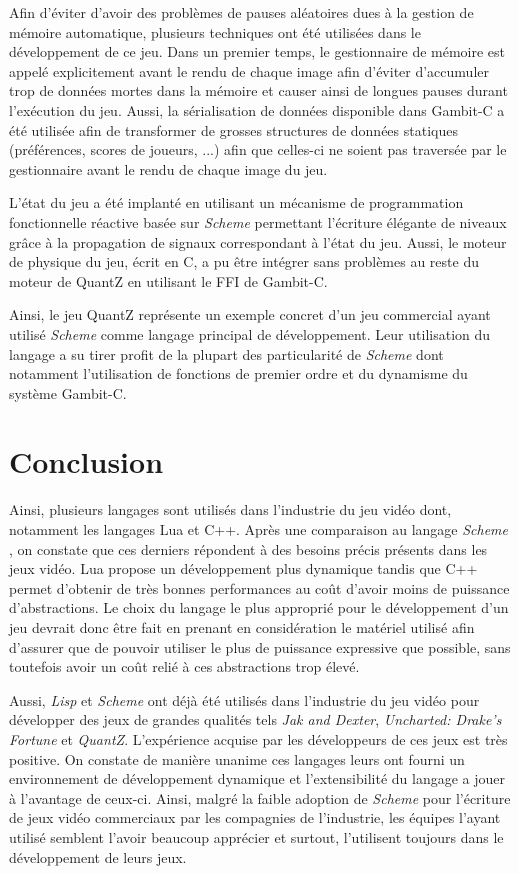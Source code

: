 \documentclass[12pt,twoside,letterpaper,francais]{book}
\newcommand{\lisp}{{\textit{Lisp }}}
\newcommand{\Schemelang}{{\textit{Scheme }}}
\begin{document}
Afin d'éviter d'avoir des problèmes de pauses aléatoires dues à la
gestion de mémoire automatique, plusieurs techniques ont été utilisées
dans le développement de ce jeu. Dans un premier temps, le
gestionnaire de mémoire est appelé explicitement avant le rendu de
chaque image afin d'éviter d'accumuler trop de données mortes dans la
mémoire et causer ainsi de longues pauses durant l'exécution du
jeu. Aussi, la sérialisation de données disponible dans Gambit-C a été
utilisée afin de transformer de grosses structures de données
statiques (préférences, scores de joueurs, ...) afin que celles-ci ne
soient pas traversée par le gestionnaire avant le rendu de chaque
image du jeu.

L'état du jeu a été implanté en utilisant un mécanisme de
programmation fonctionnelle réactive basée sur \Schemelang permettant
l'écriture élégante de niveaux grâce à la propagation de signaux
correspondant à l'état du jeu. Aussi, le moteur de physique du jeu,
écrit en C, a pu être intégrer sans problèmes au reste du moteur de
QuantZ en utilisant le FFI de Gambit-C.

Ainsi, le jeu QuantZ représente un exemple concret d'un jeu commercial
ayant utilisé \Schemelang comme langage principal de développement. Leur
utilisation du langage a su tirer profit de la plupart des
particularité de \Schemelang dont notamment l'utilisation de fonctions de
premier ordre et du dynamisme du système Gambit-C.


\FloatBarrier
\section{Conclusion}
Ainsi, plusieurs langages sont utilisés dans l'industrie du jeu vidéo
dont, notamment les langages Lua et C++. Après une comparaison au
langage \Schemelang, on constate que ces derniers répondent à des besoins
précis présents dans les jeux vidéo. Lua propose un développement plus
dynamique tandis que C++ permet d'obtenir de très bonnes performances
au coût d'avoir moins de puissance d'abstractions. Le choix du langage
le plus approprié pour le développement d'un jeu devrait donc être
fait en prenant en considération le matériel utilisé afin d'assurer
que de pouvoir utiliser le plus de puissance expressive que possible,
sans toutefois avoir un coût relié à ces abstractions trop élevé.

Aussi, \lisp et \Schemelang ont déjà été utilisés dans l'industrie du jeu
vidéo pour développer des jeux de grandes qualités tels \textit{Jak
  and Dexter}, \textit{Uncharted: Drake's Fortune} et
\textit{QuantZ}. L'expérience acquise par les développeurs de ces jeux
est très positive. On constate de manière unanime ces langages leurs
ont fourni un environnement de développement dynamique et
l'extensibilité du langage a jouer à l'avantage de ceux-ci. Ainsi,
malgré la faible adoption de \Schemelang pour l'écriture de jeux vidéo
commerciaux par les compagnies de l'industrie, les équipes l'ayant
utilisé semblent l'avoir beaucoup apprécier et surtout, l'utilisent
toujours dans le développement de leurs jeux.
\end{document}
